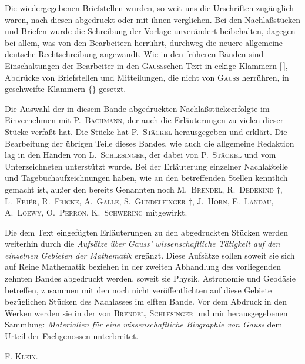 Die wiedergegebenen Briefstellen wurden, so weit uns die Urschriften zugänglich waren, nach diesen abgedruckt oder mit ihnen verglichen. Bei den Nachlaßstücken und Briefen wurde die Schreibung der
\clearpage
{}
\noindent Vorlage unverändert beibehalten, dagegen bei allem, was von den Bearbeitern herrührt, durchweg die neuere allgemeine deutsche Rechtschreibung angewandt. Wie in den früheren Bänden sind Einschaltungen der Bearbeiter in den \textsc{Gauss}schen Text in eckige Klammern [\,], Abdrücke von Briefstellen und Mitteilungen, die nicht von \textsc{Gauss} herrühren, in geschweifte Klammern $\bigl\{\bigr\}$ gesetzt.

Die Auswahl der in diesem Bande abgedruckten  Nachlaßstücke\linebreak erfolgte im Einvernehmen mit P.\ \textsc{Bachmann}, der auch die Erläuterungen zu vielen dieser Stücke verfaßt hat. Die  Stücke hat P.\ \textsc{Stäckel} herausgegeben und erklärt. Die Bearbeitung der übrigen Teile dieses Bandes, wie auch die allgemeine Redaktion lag in den Händen von L.\ \textsc{Schlesinger}, der dabei von P.\ \textsc{Stäckel} und vom Unterzeichneten unterstützt wurde. Bei der Erläuterung einzelner Nachlaßteile und Tagebuchaufzeichnungen haben, wie an den betreffenden Stellen kenntlich gemacht ist, außer den bereits Genannten noch M.\ \textsc{Brendel}, R.\ \textsc{Dedekind} †, L.\ \textsc{Fejér}, R.\ \textsc{Fricke}, A.\ \textsc{Galle}, S.\ \textsc{Gundelfinger} †, J.\ \textsc{Horn}, E.\ \textsc{Landau}, A.\ \textsc{Loewy}, O.\ \textsc{Perron}, K.\ \textsc{Schwering} mitgewirkt.

Die dem Text eingefügten Erläuterungen zu den abgedruckten Stücken werden weiterhin durch die \emph{Aufsätze über Gauss’ wissenschaftliche Tätigkeit auf den einzelnen Gebieten der Mathematik} ergänzt. Diese Aufsätze sollen soweit sie sich auf Reine Mathematik beziehen in der zweiten Abhandlung des vorliegenden zehnten Bandes abgedruckt werden, soweit sie Physik, Astronomie und Geodäsie betreffen, zusammen mit den noch nicht veröffentlichten auf diese Gebiete bezüglichen Stücken des Nachlasses im elften Bande. Vor dem Abdruck in den Werken werden sie in der von \textsc{Brendel}, \textsc{Schlesinger} und mir herausgegebenen Sammlung: \emph{Materialien für eine wissenschaftliche Biographie von Gauss} dem Urteil der Fachgenossen unterbreitet.
\begin{flushright}\textsc{F. Klein.}\end{flushright}
\ClosingRule
